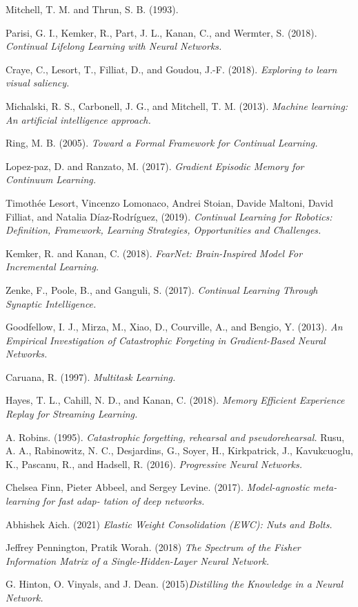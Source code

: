 \documentclass[english, LaM, oneside]{sapthesis}%
\begin{document}
\begin{thebibliography}{17}
Mitchell, T. M. and Thrun, S. B. (1993). 

Parisi, G. I., Kemker, R., Part, J. L., Kanan, C., and Wermter, S. (2018). \textit{ Continual Lifelong Learning with Neural Networks.} 
 
Craye, C., Lesort, T., Filliat, D., and Goudou, J.-F. (2018). \textit{Exploring to learn visual saliency.}  
 
Michalski, R. S., Carbonell, J. G., and Mitchell, T. M. (2013). \textit{Machine learning: An artificial intelligence approach.}   
  
Ring, M. B. (2005). \textit{Toward a Formal Framework for Continual Learning.}    
 
Lopez-paz, D. and Ranzato, M. (2017). \textit{Gradient Episodic Memory for Continuum Learning.}    


Timothée Lesort, Vincenzo Lomonaco, Andrei Stoian, Davide Maltoni, David Filliat, and Natalia Díaz-Rodríguez, (2019). \textit{Continual Learning for Robotics: Definition, Framework, Learning Strategies, Opportunities and Challenges.} 

Kemker, R. and Kanan, C. (2018). \textit{FearNet: Brain-Inspired Model For Incremental Learning.} 

Zenke, F., Poole, B., and Ganguli, S. (2017). \textit{Continual Learning Through Synaptic Intelligence.} 

Goodfellow, I. J., Mirza, M., Xiao, D., Courville, A., and Bengio, Y. (2013). \textit{An Empirical Investigation of Catastrophic Forgeting in Gradient-Based Neural Networks.} 

Caruana, R. (1997). \textit{Multitask Learning.} 

Hayes, T. L., Cahill, N. D., and Kanan, C. (2018). \textit{Memory Efficient Experience Replay for Streaming Learning.} 
 
A. Robins. (1995). \textit{Catastrophic forgetting, rehearsal and pseudorehearsal.}  
Rusu, A. A., Rabinowitz, N. C., Desjardins, G., Soyer, H., Kirkpatrick, J., Kavukcuoglu, K., Pascanu, R., and Hadsell, R. (2016). \textit{Progressive Neural Networks.}     
 
Chelsea Finn, Pieter Abbeel, and Sergey Levine. (2017). \textit{Model-agnostic meta-learning for fast adap- tation of deep networks.} 

Abhishek Aich. (2021) \textit{Elastic Weight Consolidation (EWC): Nuts and Bolts.}

Jeffrey Pennington, Pratik Worah. (2018) \textit{The Spectrum of the Fisher Information Matrix of a Single-Hidden-Layer Neural Network.}

G. Hinton, O. Vinyals, and J. Dean. (2015)\textit{Distilling the Knowledge in a Neural Network.} 
\end{thebibliography}
\end{document}
